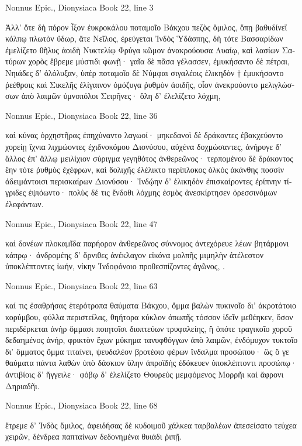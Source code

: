 \documentclass[12pt,letterpaper,twoside,final]{memoir}
\begin{document}
\begin{greek}
Nonnus Epic., Dionysiaca 
Book 22, line 3

Ἀλλ' ὅτε δὴ πόρον ἷξον ἐυκροκάλου ποταμοῖο 
Βάκχου πεζὸς ὅμιλος, ὅπῃ βαθυδίνεϊ κόλπῳ 
πλωτὸν ὕδωρ, ἅτε Νεῖλος, ἐρεύγεται Ἰνδὸς Ὑδάσπης, 
δὴ τότε Βασσαρίδων ἐμελίζετο θῆλυς ἀοιδὴ 
Νυκτελίῳ Φρύγα κῶμον ἀνακρούουσα Λυαίῳ, 
καὶ λασίων Σατύρων χορὸς ἔβρεμε μύστιδι φωνῇ· 
γαῖα δὲ πᾶσα γέλασσεν, ἐμυκήσαντο δὲ πέτραι, 
Νηιάδες δ' ὀλόλυξαν, ὑπὲρ ποταμοῖο δὲ Νύμφαι 
σιγαλέοις ἑλικηδὸν † ἐμυκήσαντο ῥεέθροις 
καὶ Σικελῆς ἐλίγαινον ὁμόζυγα ῥυθμὸν ἀοιδῆς, 
οἷον ἀνεκρούοντο μελιγλώσσων ἀπὸ λαιμῶν 
ὑμνοπόλοι Σειρῆνες· ὅλη δ' ἐλελίζετο λόχμη, 




Nonnus Epic., Dionysiaca 
Book 22, line 36

καὶ κύνας ὀρχηστῆρας ἐπηχύναντο λαγωοί· 
μηκεδανοὶ δὲ δράκοντες ἐβακχεύοντο χορείῃ 
ἴχνια λιχμώοντες ἐχιδνοκόμου Διονύσου, 
αὐχένα δοχμώσαντες, ἀνήρυγε δ' ἄλλος ἐπ' ἄλλῳ 
μειλίχιον σύριγμα γεγηθότος ἀνθερεῶνος· 
τερπομένου δὲ δράκοντος ἔην τότε ῥυθμὸς ἐχέφρων,   
καὶ δολιχῆς ἐλέλικτο περίπλοκος ὁλκὸς ἀκάνθης 
ποσσὶν ἀδειμάντοισι περισκαίρων Διονύσου· 
Ἰνδῴην δ' ἑλικηδὸν ἐπισκαίροντες ἐρίπνην 
τίγριδες ἑψιόωντο· πολὺς δέ τις ἔνδοθι λόχμης 
ἐσμὸς ἀνεσκίρτησεν ὀρεσσινόμων ἐλεφάντων. 



Nonnus Epic., Dionysiaca 
Book 22, line 47

καὶ δονέων πλοκαμῖδα παρήορον ἀνθερεῶνος 
σύννομος ἀντεχόρευε λέων βητάρμονι κάπρῳ· 
ἀνδρομέης δ' ὄρνιθες ἀνέκλαγον εἰκόνα μολπῆς 
μιμηλὴν ἀτέλεστον ὑποκλέπτοντες ἰωήν, 
νίκην Ἰνδοφόνοιο προθεσπίζοντες ἀγῶνος, . 



Nonnus Epic., Dionysiaca 
Book 22, line 63

καί τις ἐσαθρήσας ἑτερότροπα θαύματα Βάκχου, 
ὄμμα βαλὼν πυκινοῖο δι' ἀκροτάτοιο κορύμβου, 
φύλλα περιστείλας, θηήτορα κύκλον ὀπωπῆς 
τόσσον ἰδεῖν μεθέηκεν, ὅσον περιδέρκεται ἀνὴρ 
ὄμμασι ποιητοῖσι διοπτεύων τρυφαλείης, 
ἢ ὁπότε τραγικοῖο χοροῦ δεδαημένος ἀνήρ, 
φρικτὸν ἔχων μύκημα τανυφθόγγων ἀπὸ λαιμῶν, 
ἐνδόμυχον τυκτοῖο δι' ὄμματος ὄμμα τιταίνει, 
ψευδαλέον βροτέοιο φέρων ἴνδαλμα προσώπου· 
ὣς ὅ γε θαύματα πάντα λαθὼν ὑπὸ δάσκιον ὕλην 
ἀπροϊδὴς ἐδόκευεν ὑποκλέπτοντι προσώπῳ· 
ἀντιβίοις δ' ἤγγειλε· φόβῳ δ' ἐλελίζετο Θουρεὺς 
μεμφόμενος Μορρῆι καὶ ἄφρονι Δηριαδῆι. 



Nonnus Epic., Dionysiaca 
Book 22, line 68

ἔτρεμε δ' Ἰνδὸς ὅμιλος, ἀφειδήσας δὲ κυδοιμοῦ 
χάλκεα ταρβαλέων ἀπεσείσατο τεύχεα χειρῶν, 
δένδρεα παπταίνων δεδονημένα θυιάδι ῥιπῇ. 




\end{greek}
\end{document}
